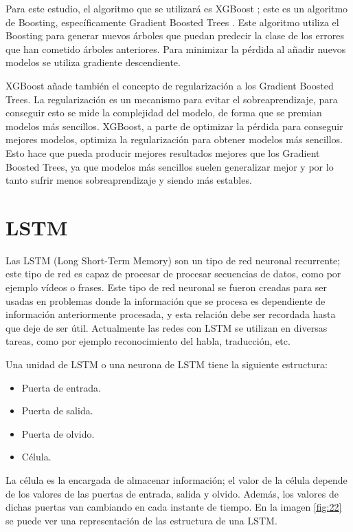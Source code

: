 Para este estudio, el algoritmo que se utilizará es XGBoost \cite{chen2016xgboost}; este es un algoritmo de Boosting, específicamente Gradient Boosted Trees \cite{friedman2002stochastic}. Este algoritmo utiliza el Boosting para generar nuevos árboles que puedan predecir la clase de los errores que han cometido árboles anteriores. Para minimizar la pérdida al añadir nuevos modelos se utiliza gradiente descendiente.\newline

XGBoost añade también el concepto de regularización a los Gradient Boosted Trees. La regularización es un mecanismo para evitar el sobreaprendizaje, para conseguir esto se mide la complejidad del modelo, de forma que se premian modelos más sencillos. XGBoost, a parte de optimizar la pérdida para conseguir mejores modelos, optimiza la regularización para obtener modelos más sencillos. Esto hace que pueda producir mejores resultados mejores que los Gradient Boosted Trees, ya que modelos más sencillos suelen generalizar mejor y por lo tanto sufrir menos sobreaprendizaje y siendo más estables.

\newpage
\section{LSTM}
Las LSTM (Long Short-Term Memory) \cite{hochreiter1997long} son un tipo de red neuronal recurrente; este tipo de red es capaz de procesar de procesar secuencias de datos, como por ejemplo vídeos o frases. Este tipo de red neuronal se fueron creadas para ser usadas en problemas donde la información que se procesa es dependiente de información anteriormente procesada, y esta relación debe ser recordada hasta que deje de ser útil. Actualmente las redes con LSTM se utilizan en diversas tareas, como por ejemplo reconocimiento del habla, traducción, etc.\newline

Una unidad de LSTM o una neurona de LSTM tiene la siguiente estructura:
\begin{itemize}
	\item Puerta de entrada.
	\item Puerta de salida.
	\item Puerta de olvido.
	\item Célula.
\end{itemize}
\vspace{0.09in}
La célula es la encargada de almacenar información; el valor de la célula depende de los valores de las puertas de entrada, salida y olvido. Además, los valores de dichas puertas van cambiando en cada instante de tiempo. En la imagen \ref{fig:22} se puede ver una representación de las estructura de una LSTM.

